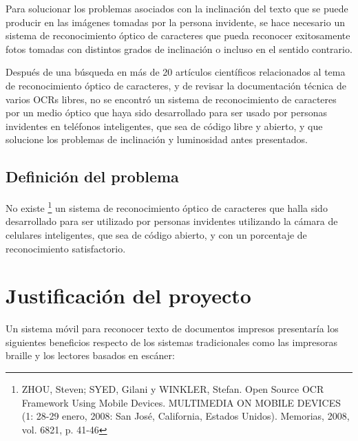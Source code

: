 \documentclass[a4paper, 11pt, oneside]{report}
\begin{document}
Para solucionar los problemas asociados con la inclinación del texto que se puede producir en las imágenes tomadas por la persona invidente, se hace necesario un sistema de reconocimiento óptico de caracteres que pueda reconocer exitosamente fotos tomadas con distintos grados de inclinación o incluso en el sentido contrario.

Después de una búsqueda en más de 20 artículos científicos relacionados al tema de reconocimiento óptico de caracteres, y de revisar la documentación técnica de varios OCRs libres, no se encontró un sistema de reconocimiento de caracteres por un medio óptico que haya sido desarrollado para ser usado por personas invidentes en teléfonos inteligentes, que sea de código libre y abierto, y que solucione los problemas de inclinación y luminosidad antes presentados. 

\subsection{Definición del problema}

No existe \footnote{ZHOU, Steven; SYED, Gilani y WINKLER, Stefan. Open Source OCR Framework Using Mobile Devices. MULTIMEDIA ON MOBILE DEVICES (1: 28-29 enero, 2008: San José, California, Estados Unidos). Memorias, 2008, vol. 6821, p. 41-46} un sistema de reconocimiento óptico de caracteres que halla sido desarrollado para ser utilizado por personas invidentes utilizando la cámara de celulares inteligentes, que sea de código abierto, y con un porcentaje de reconocimiento satisfactorio.

\section{Justificación del proyecto}

Un sistema móvil para reconocer texto de documentos impresos presentaría los siguientes beneficios respecto de los sistemas tradicionales como las impresoras braille y los lectores basados en escáner:
\end{document}
